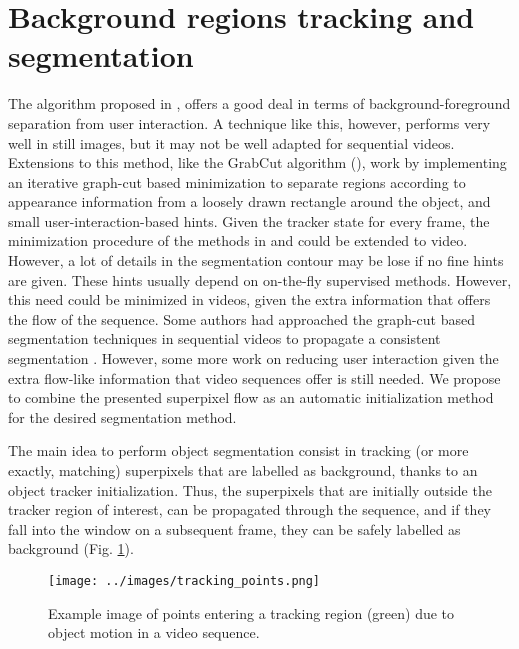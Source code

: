 
\section{Background regions tracking and segmentation}
\label{sec:segm}
The algorithm proposed in \cite{c18}, offers a good deal in terms of
background-foreground separation from user interaction. A technique like this, however,
performs very well in still images, but it may not be well adapted for sequential videos. 
Extensions to this method, like the GrabCut algorithm (\cite{c14}), work by implementing an iterative graph-cut based 
minimization to separate regions according to appearance information from a loosely drawn rectangle around the object, and small user-interaction-based hints. 
Given the tracker state for every frame, the minimization procedure of the methods in \cite{c18} and \cite{c14} could be extended to video. However, 
a lot of details in the segmentation contour may be lose if no fine hints are given.
These hints usually depend on on-the-fly supervised methods. However, this need could be minimized in videos, given the extra information that offers the flow of the sequence.
Some authors had approached the graph-cut based segmentation techniques in sequential
videos to propagate a consistent segmentation \cite{c15}. However, some more work on reducing user interaction given the extra flow-like information
that video sequences offer is still needed.
We propose to combine the presented superpixel flow as an automatic initialization method for the desired segmentation method.
 
The main idea to perform object segmentation consist in tracking (or more exactly, matching) superpixels that are labelled as background, thanks to an object tracker initialization. Thus, the superpixels that are initially outside the tracker region of interest, 
can be propagated through the sequence, and if they fall into the window on a subsequent frame, they
can be safely labelled as background (Fig.  \ref{figurelabel_entering}). \\

   \begin{figure}[thpb]
      \centering
      \texttt{[image: ../images/tracking\_points.png]}
      \caption{Example image of points entering a tracking region (green) due to object motion in a video sequence.}
      \label{figurelabel_entering}
   \end{figure}
\setlength{\belowcaptionskip}{-10pt}

